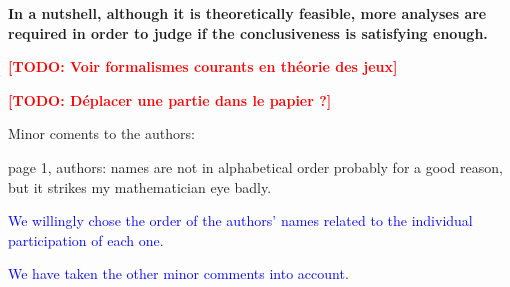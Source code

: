 \documentclass[11pt]{article}
\newcommand{\todo}[1]{\textcolor{red}{\textbf{[TODO: #1]}}}
\newcommand{\ilanswer}[1]{\textcolor{blue}{#1}}
\newcommand{\answer}[1]{\ilanswer{#1}\vspace*{1em}}
\begin{document}
{\begin{itemize}
    \textbf{In a nutshell, although it is theoretically feasible, more analyses are required in order to judge if the conclusiveness is satisfying enough.}
\end{itemize}
}

\todo{Voir formalismes courants en théorie des jeux}

\todo{Déplacer une partie dans le papier ?}



Minor coments to the authors:

page 1, authors: names are not in alphabetical order probably for a good reason, but it strikes my mathematician eye badly.

\answer{We willingly chose the order of the authors' names related to the individual participation of each one.}

\answer{We have taken the other minor comments into account.}



\end{document}
